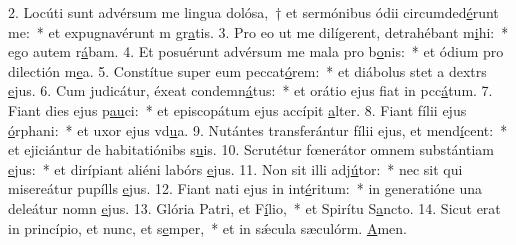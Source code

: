 2. Locúti sunt advérsum me lingua dolósa,~† et sermónibus ódii circumded\uline{é}runt me:~* et expugnavérunt m gr\uline{a}tis.
3. Pro eo ut me dilígerent, detrahébant m\uline{i}hi:~* ego autem r\uline{á}bam.
4. Et posuérunt advérsum me mala pro b\uline{o}nis:~* et ódium pro dilectión m\uline{e}a.
5. Constítue super eum peccat\uline{ó}rem:~* et diábolus stet a dextrs \uline{e}jus.
6. Cum judicátur, éxeat condemn\uline{á}tus:~* et orátio ejus fiat in pcc\uline{á}tum.
7. Fiant dies ejus p\uline{au}ci:~* et episcopátum ejus accípit \uline{a}lter.
8. Fiant fílii ejus \uline{ó}rphani:~* et uxor ejus vd\uline{u}a.
9. Nutántes transferántur fílii ejus, et mend\uline{í}cent:~* et ejiciántur de habitatiónibs s\uline{u}is.
10. Scrutétur fœnerátor omnem substántiam \uline{e}jus:~* et dirípiant aliéni labórs \uline{e}jus.
11. Non sit illi adj\uline{ú}tor:~* nec sit qui misereátur pupílls \uline{e}jus.
12. Fiant nati ejus in int\uline{é}ritum:~* in generatióne una deleátur nomn \uline{e}jus.
13. Glória Patri, et F\uline{í}lio,~* et Spirítu S\uline{a}ncto.
14. Sicut erat in princípio, et nunc, et s\uline{e}mper,~* et in sǽcula sæculórm. \uline{A}men.
